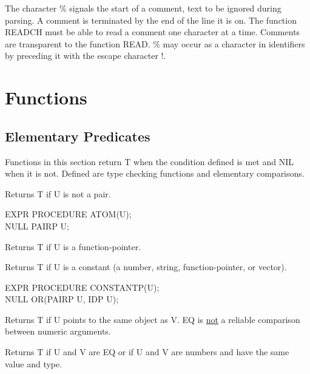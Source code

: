  \index{\%}
The character \% signals the start of a comment, text to be ignored
during parsing.  A comment is terminated by the end of the line it
 
is on.  The function READCH must be able to read a comment one
character at a time.  Comments are transparent to the function READ.
\% may occur as a character in identifiers by preceding it with the
escape character !.


\section{Functions}
\label{slfns}

\subsection{Elementary Predicates}
\label{elpreds}
 
Functions in this section return T when the condition defined is met
and NIL when it is not. Defined are type checking functions and
elementary comparisons.


{Returns T if U is not a pair.

{\tt \begin{tabbing} EXPR PROCEDURE ATOM(U); \\
\hspace*{1em} NULL PAIRP U;
\end{tabbing}}}


{Returns T if U is a function-pointer.}


{Returns T if U is a constant (a number, string, function-pointer, or
vector).

{\tt \begin{tabbing} EXPR PROCEDURE CONSTANTP(U); \\
\hspace*{1em} NULL OR(PAIRP U, IDP U);
\end{tabbing}}
}



{Returns T if U points to the same object as V. EQ is \underline{not}
a reliable comparison between numeric arguments. }


{Returns T if U and V are EQ or if U and V are numbers and have the
same value and type. }


